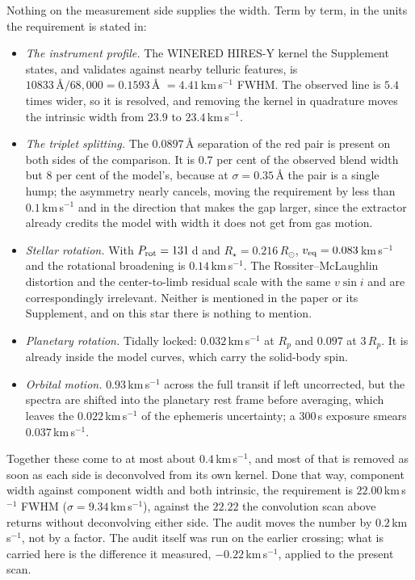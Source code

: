 \documentclass[english,a4paper]{my_memo}
\begin{document}
\medskip
\noindent Nothing on the measurement side supplies the width. Term by term,
in the units the requirement is stated in:

\begin{itemize}
\item \emph{The instrument profile.} The WINERED HIRES-Y kernel the
      Supplement states, and validates against nearby telluric features, is
      $10833\,\text{\AA}/68{,}000 = 0.1593$\,\AA{} $= 4.41$\,km\,s$^{-1}$
      FWHM. The observed line is $5.4$ times wider, so it is resolved, and
      removing the kernel in quadrature moves the intrinsic width from
      $23.9$ to $23.4$\,km\,s$^{-1}$.
\item \emph{The triplet splitting.} The $0.0897$\,\AA{} separation of the
      red pair is present on both sides of the comparison. It is $0.7$ per
      cent of the observed blend width but $8$ per cent of the model's,
      because at $\sigma = 0.35$\,\AA{} the pair is a single hump; the
      asymmetry nearly cancels, moving the requirement by less than
      $0.1$\,km\,s$^{-1}$ and in the direction that makes the gap larger,
      since the extractor already credits the model with width it does not
      get from gas motion.
\item \emph{Stellar rotation.} With $P_{\rm rot} = 131$\,d and
      $R_\star = 0.216\,R_\odot$, $v_{\rm eq} = 0.083$\,km\,s$^{-1}$ and the
      rotational broadening is $0.14$\,km\,s$^{-1}$. The
      Rossiter--McLaughlin distortion and the center-to-limb residual scale
      with the same $v\sin i$ and are correspondingly irrelevant. Neither
      is mentioned in the paper or its Supplement, and on this star there
      is nothing to mention.
\item \emph{Planetary rotation.} Tidally locked: $0.032$\,km\,s$^{-1}$ at
      $R_p$ and $0.097$ at $3\,R_p$. It is already inside the model curves,
      which carry the solid-body spin.
\item \emph{Orbital motion.} $0.93$\,km\,s$^{-1}$ across the full transit if
      left uncorrected, but the spectra are shifted into the planetary rest
      frame before averaging, which leaves the $0.022$\,km\,s$^{-1}$ of the
      ephemeris uncertainty; a $300$\,s exposure smears
      $0.037$\,km\,s$^{-1}$.
\end{itemize}

\noindent Together these come to at most about $0.4$\,km\,s$^{-1}$, and most
of that is removed as soon as each side is deconvolved from its own kernel.
Done that way, component width against component width and both intrinsic,
the requirement is $22.00$\,km\,s$^{-1}$ FWHM
($\sigma = 9.34$\,km\,s$^{-1}$), against the $22.22$ the convolution scan
above returns without deconvolving either side. The audit moves the number by
$0.2$\,km\,s$^{-1}$, not by a factor. The audit itself was run on the earlier
crossing; what is carried here is the difference it measured,
$-0.22$\,km\,s$^{-1}$, applied to the present scan.
\end{document}
